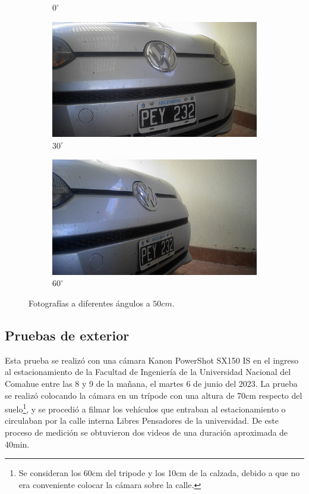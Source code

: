 \begin{figure}[bth]
\begin{subfigure}{.15\textwidth}
        \caption{$0^\circ$}
    \end{subfigure}
    \begin{subfigure}{.15\textwidth}
        \centering
        \includegraphics[width=\textwidth]{imgs/test-angulos/30_50.jpg}
        \caption{$30^\circ$}
    \end{subfigure}
    \begin{subfigure}{.15\textwidth}
        \centering
        \includegraphics[width=\textwidth]{imgs/test-angulos/60_50.jpg}
        \caption{$60^\circ$}
    \end{subfigure}
    \caption{Fotografías a diferentes ángulos a $50cm$.}
    \label{fig:fotos-angulo}
\end{figure}

\subsection{Pruebas de exterior}
Esta prueba se realizó con una cámara Kanon PowerShot SX150 IS \cite{kanon_powershot_nodate} en el ingreso al estacionamiento de la Facultad de Ingeniería de la Universidad Nacional del Comahue entre las 8 y 9 de la mañana, el martes 6 de junio del 2023. La prueba se realizó colocando la cámara en un trípode con una altura de 70cm respecto del suelo\footnote{Se consideran los 60cm del tripode y los 10cm de la calzada, debido a que no era conveniente colocar la cámara sobre la calle.}, y se procedió a filmar los vehículos que entraban al estacionamiento o circulaban por la calle interna Libres Pensadores de la universidad. De este proceso de medición se obtuvieron dos videos de una duración aproximada de 40min.

